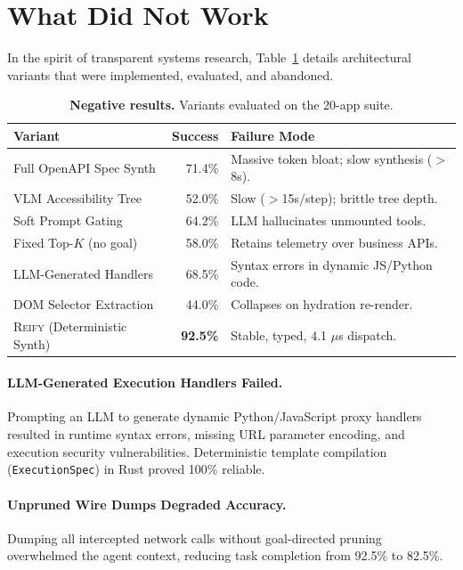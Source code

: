 \documentclass[10pt,twocolumn]{article}
\begin{document}
\section{What Did Not Work}
\label{sec:negative}

In the spirit of transparent systems research, Table~\ref{tab:negative} details architectural variants that were implemented, evaluated, and abandoned.

\begin{table}[h]
\centering
\small
\begin{tabularx}{\columnwidth}{lrX}
\toprule
\textbf{Variant} & \textbf{Success} & \textbf{Failure Mode} \\
\midrule
Full OpenAPI Spec Synth & 71.4\% & Massive token bloat; slow synthesis ($>$8s). \\
VLM Accessibility Tree & 52.0\% & Slow ($>$15s/step); brittle tree depth. \\
Soft Prompt Gating & 64.2\% & LLM hallucinates unmounted tools. \\
Fixed Top-$K$ (no goal) & 58.0\% & Retains telemetry over business APIs. \\
LLM-Generated Handlers & 68.5\% & Syntax errors in dynamic JS/Python code. \\
DOM Selector Extraction & 44.0\% & Collapses on hydration re-render. \\
\midrule
\textsc{Reify} (Deterministic Synth) & \textbf{92.5\%} & Stable, typed, 4.1 $\mu$s dispatch. \\
\bottomrule
\end{tabularx}
\caption{\textbf{Negative results.} Variants evaluated on the 20-app suite.}
\label{tab:negative}
\end{table}

\paragraph{LLM-Generated Execution Handlers Failed.}
Prompting an LLM to generate dynamic Python/JavaScript proxy handlers resulted in runtime syntax errors, missing URL parameter encoding, and execution security vulnerabilities. Deterministic template compilation (\texttt{ExecutionSpec}) in Rust proved 100\% reliable.

\paragraph{Unpruned Wire Dumps Degraded Accuracy.}
Dumping all intercepted network calls without goal-directed pruning overwhelmed the agent context, reducing task completion from 92.5\% to 82.5\%.
\end{document}
